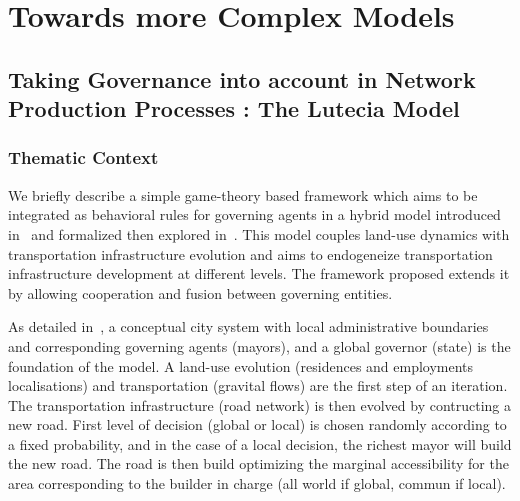 




\chapter{Towards more Complex Models} %

\label{ch:methodology} %



\section[The Lutecia Model]{Taking Governance into account in Network Production Processes : The Lutecia Model}


\subsection{Thematic Context}


We briefly describe a simple game-theory based framework which aims to be integrated as behavioral rules for governing agents in a hybrid model introduced in~\cite{le2010approche} and formalized then explored in~\cite{lenechet2012}. This model couples land-use dynamics with transportation infrastructure evolution and aims to endogeneize transportation infrastructure development at different levels. The framework proposed extends it by allowing cooperation and fusion between governing entities.



As detailed in~\cite{lenechet2012}, a conceptual city system with local administrative boundaries and corresponding governing agents (mayors), and a global governor (state) is the foundation of the model. A land-use evolution (residences and employments localisations) and transportation (gravital flows) are the first step of an iteration. The transportation infrastructure (road network) is then evolved by contructing a new road. First level of decision (global or local) is chosen randomly according to a fixed probability, and in the case of a local decision, the richest mayor will build the new road. The road is then build optimizing the marginal accessibility for the area corresponding to the builder in charge (all world if global, commun if local).

